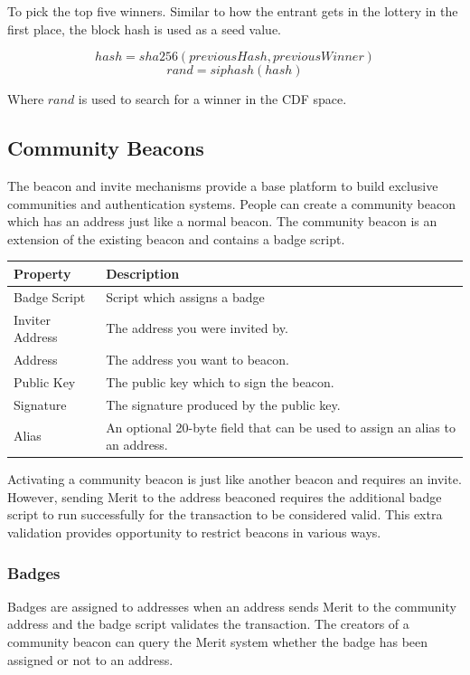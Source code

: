 \documentclass{article}
\begin{document}
To pick the top five winners. Similar to how the entrant gets in the lottery in the
first place, the block hash is used as a seed value.

$$hash = sha256(previousHash, previousWinner)$$
$$rand = siphash(hash)$$

Where $rand$ is used to search for a winner in the CDF space.

\subsection{Community Beacons}

The beacon and invite mechanisms provide a base platform to build exclusive
communities and authentication systems. People can create a community beacon
which has an address just like a normal beacon. The community beacon is an
extension of the existing beacon and contains a badge script.

\begin{center}
    \begin{tabular}{l|p{9cm}}
        Property & Description \\ \hline
        Badge Script & Script which assigns a badge \\
        Inviter Address & The address you were invited by. \\
        Address & The address you want to beacon. \\
        Public Key & The public key which to sign the beacon. \\
        Signature & The signature produced by the public key. \\
        Alias & An optional 20-byte field that can be used to assign an alias to an address.\\
    \end{tabular}
\end{center}

Activating a community beacon is just like another beacon and requires an invite.
However, sending Merit to the address beaconed requires the additional badge script to
run successfully for the transaction to be considered valid. This extra validation
provides opportunity to restrict beacons in various ways.

\subsubsection{Badges}

Badges are assigned to addresses when an address sends Merit to the community address
and the badge script validates the transaction. The creators of a community beacon
can query the Merit system whether the badge has been assigned or not to an address.
\end{document}
